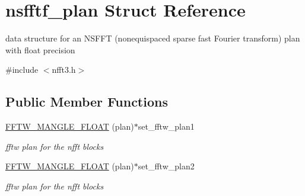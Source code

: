 \hypertarget{structnsfftf__plan}{\section{nsfftf\-\_\-plan Struct Reference}
\label{structnsfftf__plan}
}


data structure for an N\-S\-F\-F\-T (nonequispaced sparse fast Fourier transform) plan with float precision  




{\ttfamily \#include $<$nfft3.\-h$>$}

\subsection*{Public Member Functions}
\begin{DoxyCompactItemize}
\item 
\hypertarget{structnsfftf__plan_ac0a9dbecfd535a1c7b2c0cfec5b79925}{\hyperlink{structnsfftf__plan_ac0a9dbecfd535a1c7b2c0cfec5b79925}{F\-F\-T\-W\-\_\-\-M\-A\-N\-G\-L\-E\-\_\-\-F\-L\-O\-A\-T} (plan)$\ast$set\-\_\-fftw\-\_\-plan1}\label{structnsfftf__plan_ac0a9dbecfd535a1c7b2c0cfec5b79925}

\begin{DoxyCompactList}\small\item\em fftw plan for the nfft blocks \end{DoxyCompactList}\item 
\hypertarget{structnsfftf__plan_a5ceb97a548f5a438ad46a12133b1b5e8}{\hyperlink{structnsfftf__plan_a5ceb97a548f5a438ad46a12133b1b5e8}{F\-F\-T\-W\-\_\-\-M\-A\-N\-G\-L\-E\-\_\-\-F\-L\-O\-A\-T} (plan)$\ast$set\-\_\-fftw\-\_\-plan2}\label{structnsfftf__plan_a5ceb97a548f5a438ad46a12133b1b5e8}

\begin{DoxyCompactList}\small\item\em fftw plan for the nfft blocks \end{DoxyCompactList}\end{DoxyCompactItemize}
